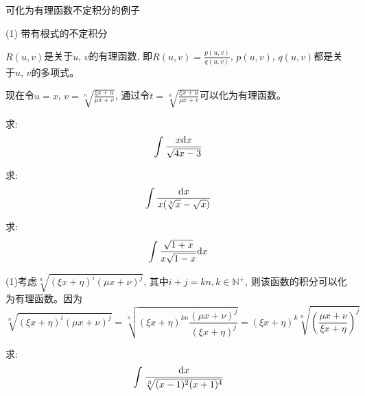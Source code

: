 可化为有理函数不定积分的例子

(1) 带有根式的不定积分

$R(u, v)$是关于$u$, $v$的有理函数, 即$R(u, v) = \frac{p(u, v)}{q(u, v)}$, $p(u, v)$, $q(u, v)$都是关于$u$, $v$的多项式。

现在令$u = x$, $v = \sqrt[n]{\frac{\xi x + u}{\mu x + v}}$, 通过令$t = \sqrt[n]{\frac{\xi x + u}{\mu x + v}}$可以化为有理函数。

\begin{example}
    求:
    \begin{equation*}
        \int \frac{x \mathrm{d} x}{\sqrt{4x-3}}
    \end{equation*}    
\end{example}
\begin{solution}
    
\end{solution}

\begin{example}
    求:
    \begin{equation*}
        \int \frac{\mathrm{d} x}{x(\sqrt[3]{x}-\sqrt{x})}
    \end{equation*}
\end{example}
\begin{solution}
    
\end{solution}

\begin{example}
    求:
    \begin{equation*}
        \int \frac{\sqrt{1+x}}{x\sqrt{1-x}} \mathrm{d} x
    \end{equation*}
\end{example}
\begin{solution}
    
\end{solution}

(1)考虑$\sqrt[n]{(\xi x+\eta)^i(\mu x + \nu)^j}$, 其中$i + j = kn, k \in \mathbb{N}^+$, 则该函数的积分可以化为有理函数。因为
\begin{equation*}
    \sqrt[n]{(\xi x+\eta)^i(\mu x + \nu)^j} = \sqrt[n]{(\xi x+\eta)^{kn}\frac{(\mu x + \nu)^j}{(\xi x+\eta)^j}} = (\xi x+\eta)^k\sqrt[n]{\left(\frac{\mu x + \nu}{\xi x+\eta}\right)^j}
\end{equation*}

\begin{example}
    求:
    \begin{equation*}
        \int \frac{\mathrm{d} x}{\sqrt[3]{(x-1)^2(x+1)^4}}
    \end{equation*}
\end{example}
\begin{solution}
    
\end{solution}

